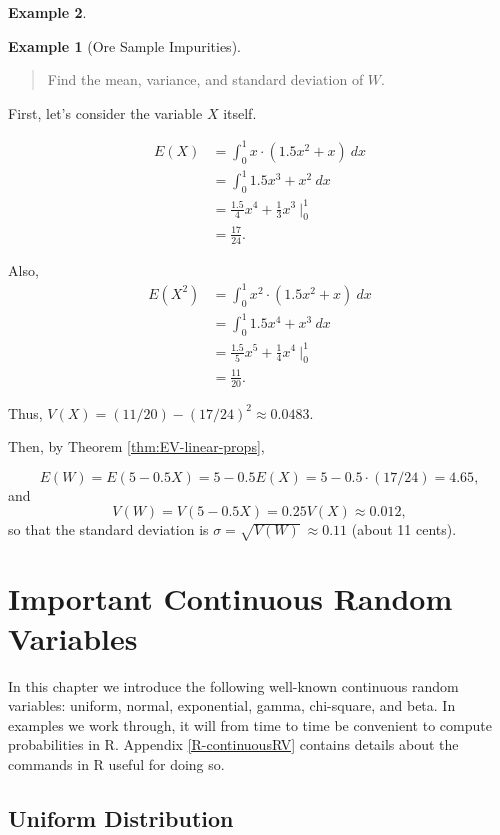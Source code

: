 \documentclass[
]{book}
\theoremstyle{definition}
\theoremstyle{definition}
\newtheorem{example}{Example}[chapter]
\theoremstyle{definition}
\theoremstyle{definition}
\theoremstyle{remark}
\begin{document}
\begin{example}
\begin{example}[Ore Sample Impurities]
\begin{quote}
Find the mean, variance, and standard deviation of \(W\).
\end{quote}

First, let's consider the variable \(X\) itself.

\begin{align*}
E(X) &= \int_0^1 x \cdot (1.5x^2 + x)~dx \\
      &= \int_0^1 1.5x^3 + x^2~dx \\
      &= \frac{1.5}{4}x^4 + \frac{1}{3} x^3 ~\biggr|_0^1 \\
      &= \frac{17}{24}.
\end{align*}

Also,
\begin{align*}
E(X^2) &= \int_0^1 x^2 \cdot (1.5x^2 + x)~dx \\
      &= \int_0^1 1.5x^4 + x^3~dx \\
      &= \frac{1.5}{5}x^5 + \frac{1}{4} x^4 ~\biggr|_0^1 \\
      &= \frac{11}{20}.
\end{align*}

Thus, \(V(X) = (11/20)-(17/24)^2 \approx 0.0483.\)

Then, by Theorem \ref{thm:EV-linear-props},

\[E(W) = E(5 - 0.5X) = 5 - 0.5E(X) = 5 - 0.5\cdot (17/24) = 4.65,\]
and
\[V(W) = V(5 - 0.5X) = 0.25V(X) \approx 0.012,\]
so that the standard deviation is \(\sigma = \sqrt{V(W)} ~\approx 0.11\) (about 11 cents).
\end{example}

\end{example}

\chapter{Important Continuous Random Variables}\label{important-continuous-rv}

In this chapter we introduce the following well-known continuous random variables:
uniform, normal, exponential, gamma, chi-square, and beta. In examples we work through, it will from time to time be convenient to compute probabilities in R. Appendix \ref{R-continuousRV} contains details about the commands in R useful for doing so.

\section{Uniform Distribution}\label{uniform-continuous}
\end{document}
